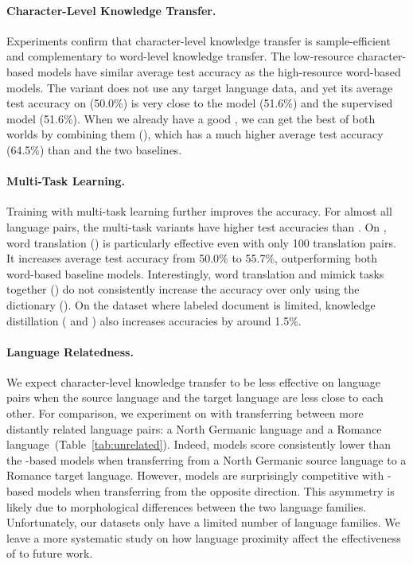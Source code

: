 \paragraph{Character-Level Knowledge Transfer.}
Experiments confirm that character-level knowledge transfer is sample-efficient
and complementary to word-level knowledge transfer.
The low-resource character-based \name{} models have similar average test
accuracy as the high-resource word-based models.
The  variant does not use any
target language data, and yet its average test accuracy on  (50.0\%)
is very close to the  model (51.6\%) and the supervised model
 (51.6\%).
When we already have a good , we can get the best of both worlds by
combining them (), which has a much higher average test accuracy
(64.5\%) than \name{} and the two baselines.

\paragraph{Multi-Task Learning.}
Training \name{} with multi-task learning further improves the accuracy.  For
almost all language pairs, the multi-task \name{} variants have higher test
accuracies than .
On , word translation () is particularly effective even
with only 100 translation pairs. 
It increases average test accuracy from 50.0\% to 55.7\%, outperforming both
word-based baseline models.
Interestingly, word translation and mimick tasks together () do not
consistently increase the accuracy over only using the dictionary ().
On the  dataset where labeled document is limited, knowledge
distillation ( and ) also increases
accuracies by around 1.5\%.

\paragraph{Language Relatedness.}
We expect character-level knowledge transfer to be less effective on language
pairs when the source language and the target language are less close to each
other.
For comparison, we experiment on  with transferring between more
distantly related language pairs: a North Germanic language and a Romance
language~(Table~\ref{tab:unrelated}).
Indeed, \name{} models score consistently
lower than the -based models when transferring from a North Germanic
source language to a Romance target language.  However, \name{} models are
surprisingly competitive with -based models when transferring from
the opposite direction.  This asymmetry is likely due to morphological
differences between the two language families.
Unfortunately, our datasets only have a limited number of language families.
We leave a more systematic study on how language proximity affect the
effectiveness of \name{} to future work.

